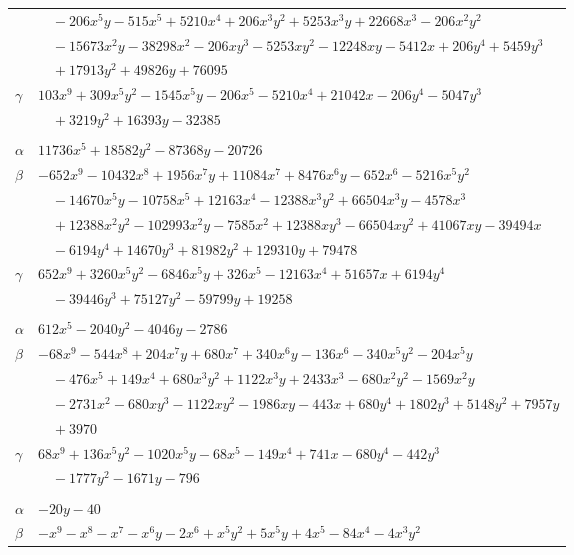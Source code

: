 \documentclass[11pt]{article}
\begin{document}
\begin{longtable}{@{}ll@{}}
 & $\quad -206x^{5}y-515x^{5}+5210x^{4}+206x^{3}y^{2}+5253x^{3}y+22668x^{3}-206x^{2}y^{2}$\\
 & $\quad -15673x^{2}y-38298x^{2}-206xy^{3}-5253xy^{2}-12248xy-5412x+206y^{4}+5459y^{3}$\\
 & $\quad +17913y^{2}+49826y+76095$\\
$\gamma$ & $103x^{9}+309x^{5}y^{2}-1545x^{5}y-206x^{5}-5210x^{4}+21042x-206y^{4}-5047y^{3}$\\
 & $\quad +3219y^{2}+16393y-32385$\\
\addlinespace[3pt]
\multicolumn{2}{@{}l}{$\{i,j\}=\{33,40\}$, $k_{ij}=2^{7}\cdot 3^{3}\cdot 17$}\\
$\alpha$ & $11736x^{5}+18582y^{2}-87368y-20726$\\
$\beta$ & $-652x^{9}-10432x^{8}+1956x^{7}y+11084x^{7}+8476x^{6}y-652x^{6}-5216x^{5}y^{2}$\\
 & $\quad -14670x^{5}y-10758x^{5}+12163x^{4}-12388x^{3}y^{2}+66504x^{3}y-4578x^{3}$\\
 & $\quad +12388x^{2}y^{2}-102993x^{2}y-7585x^{2}+12388xy^{3}-66504xy^{2}+41067xy-39494x$\\
 & $\quad -6194y^{4}+14670y^{3}+81982y^{2}+129310y+79478$\\
$\gamma$ & $652x^{9}+3260x^{5}y^{2}-6846x^{5}y+326x^{5}-12163x^{4}+51657x+6194y^{4}$\\
 & $\quad -39446y^{3}+75127y^{2}-59799y+19258$\\
\addlinespace[3pt]
\multicolumn{2}{@{}l}{$\{i,j\}=\{33,41\}$, $k_{ij}=2^{2}\cdot 3^{2}\cdot 5\cdot 11$}\\
$\alpha$ & $612x^{5}-2040y^{2}-4046y-2786$\\
$\beta$ & $-68x^{9}-544x^{8}+204x^{7}y+680x^{7}+340x^{6}y-136x^{6}-340x^{5}y^{2}-204x^{5}y$\\
 & $\quad -476x^{5}+149x^{4}+680x^{3}y^{2}+1122x^{3}y+2433x^{3}-680x^{2}y^{2}-1569x^{2}y$\\
 & $\quad -2731x^{2}-680xy^{3}-1122xy^{2}-1986xy-443x+680y^{4}+1802y^{3}+5148y^{2}+7957y$\\
 & $\quad +3970$\\
$\gamma$ & $68x^{9}+136x^{5}y^{2}-1020x^{5}y-68x^{5}-149x^{4}+741x-680y^{4}-442y^{3}$\\
 & $\quad -1777y^{2}-1671y-796$\\
\addlinespace[3pt]
\multicolumn{2}{@{}l}{$\{i,j\}=\{34,35\}$, $k_{ij}=2^{3}\cdot 5$}\\
$\alpha$ & $-20y-40$\\
$\beta$ & $-x^{9}-x^{8}-x^{7}-x^{6}y-2x^{6}+x^{5}y^{2}+5x^{5}y+4x^{5}-84x^{4}-4x^{3}y^{2}$\\

\end{longtable}
\end{document}
